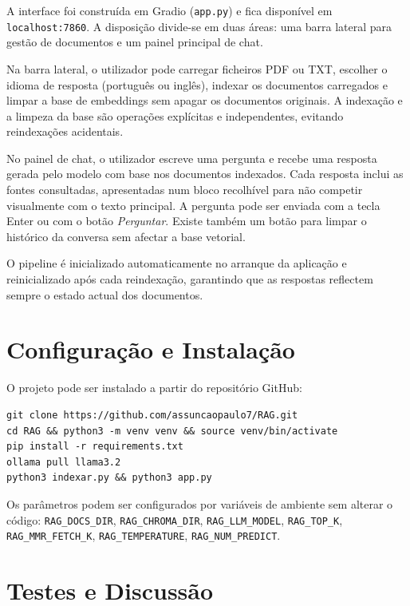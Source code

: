 \documentclass[]{ceurart}
\begin{document}
A interface foi construída em Gradio \cite{gradio} (\texttt{app.py}) e fica
disponível em \texttt{localhost:7860}. A disposição divide-se em duas áreas:
uma barra lateral para gestão de documentos e um painel principal de chat.

Na barra lateral, o utilizador pode carregar ficheiros PDF ou TXT, escolher o
idioma de resposta (português ou inglês), indexar os documentos carregados e
limpar a base de embeddings sem apagar os documentos originais. A indexação e
a limpeza da base são operações explícitas e independentes, evitando
reindexações acidentais.

No painel de chat, o utilizador escreve uma pergunta e recebe uma resposta
gerada pelo modelo com base nos documentos indexados. Cada resposta inclui
as fontes consultadas, apresentadas num bloco recolhível para não competir
visualmente com o texto principal. A pergunta pode ser enviada com a tecla
Enter ou com o botão \emph{Perguntar}. Existe também um botão para limpar
o histórico da conversa sem afectar a base vetorial.

O pipeline é inicializado automaticamente no arranque da aplicação e
reinicializado após cada reindexação, garantindo que as respostas reflectem
sempre o estado actual dos documentos.

\section{Configuração e Instalação}

O projeto pode ser instalado a partir do repositório GitHub:

\begin{lstlisting}
git clone https://github.com/assuncaopaulo7/RAG.git
cd RAG && python3 -m venv venv && source venv/bin/activate
pip install -r requirements.txt
ollama pull llama3.2
python3 indexar.py && python3 app.py
\end{lstlisting}

Os parâmetros podem ser configurados por variáveis de ambiente sem alterar o código:
\texttt{RAG\_DOCS\_DIR}, \texttt{RAG\_CHROMA\_DIR}, \texttt{RAG\_LLM\_MODEL},
\texttt{RAG\_TOP\_K}, \texttt{RAG\_MMR\_FETCH\_K}, \texttt{RAG\_TEMPERATURE},
\texttt{RAG\_NUM\_PREDICT}.

\section{Testes e Discussão}
\end{document}
